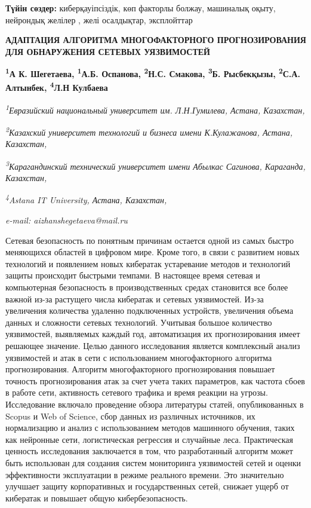 {\bfseries Түйін сөздер:} киберқауіпсіздік, көп факторлы болжау, машиналық
оқыту, нейрондық желілер , желі осалдықтар, эксплойттар

\begin{articleheader}
{\bfseries АДАПТАЦИЯ АЛГОРИТМА МНОГОФАКТОРНОГО ПРОГНОЗИРОВАНИЯ ДЛЯ ОБНАРУЖЕНИЯ СЕТЕВЫХ УЯЗВИМОСТЕЙ}

{\bfseries
\textsuperscript{1}А К. Шегетаева\textsuperscript{\envelope },
\textsuperscript{1}А.Б. Оспанова,
\textsuperscript{2}Н.С. Смакова,
\textsuperscript{3}Б. Рысбекқызы,
\textsuperscript{2}С.А. Алтынбек,
\textsuperscript{4}Л.Н Кулбаева}
\end{articleheader}

\begin{affiliation}
\emph{\textsuperscript{1}Евразийский национальный университет им. Л.Н.Гумилева, Астана, Казахстан,}

\emph{\textsuperscript{2}Казахский университет технологий и бизнеса имени К.Кулажанова, Астана, Казахстан,}

\emph{\textsuperscript{3}Карагандинский технический университет имени Абылкас Сагинова, Караганда, Казахстан,}

\emph{\textsuperscript{4}Astana IT University, Астана, Казахстан,}

\emph{e-mail: aizhanshegetaeva@mail.ru}
\end{affiliation}

Сетевая безопасность по понятным причинам остается одной из самых быстро
меняющихся областей в цифровом мире. Кроме того, в связи с развитием
новых технологий и появлением новых кибератак устаревание методов и
технологий защиты происходит быстрыми темпами. В настоящее время сетевая
и компьютерная безопасность в производственных средах становится все
более важной из-за растущего числа кибератак и сетевых уязвимостей.
Из-за увеличения количества удаленно подключенных устройств, увеличения
объема данных и сложности сетевых технологий. Учитывая большое
количество уязвимостей, выявляемых каждый год, автоматизация их
прогнозирования имеет решающее значение. Целью данного исследования
является комплексный анализ уязвимостей и атак в сети с использованием
многофакторного алгоритма прогнозирования. Алгоритм многофакторного
прогнозирования повышает точность прогнозирования атак за счет учета
таких параметров, как частота сбоев в работе сети, активность сетевого
трафика и время реакции на угрозы. Исследование включало проведение
обзора литературы статей, опубликованных в Scopus и Web of Science, сбор
данных из различных источников, их нормализацию и анализ с
использованием методов машинного обучения, таких как нейронные сети,
логистическая регрессия и случайные леса. Практическая ценность
исследования заключается в том, что разработанный алгоритм может быть
использован для создания систем мониторинга уязвимостей сетей и оценки
эффективности эксплуатации в режиме реального времени. Это значительно
улучшает защиту корпоративных и государственных сетей, снижает ущерб от
кибератак и повышает общую кибербезопасность.


